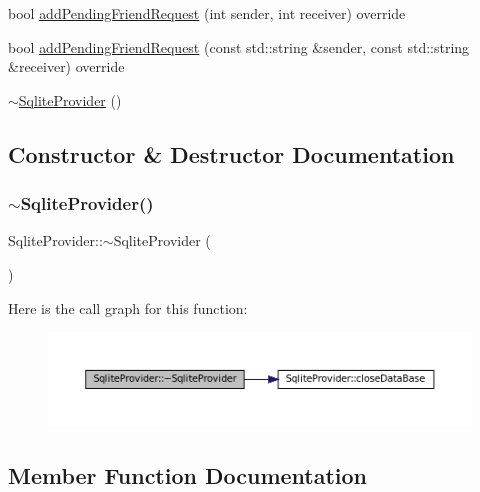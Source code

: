 \begin{DoxyCompactItemize}
\item 
bool \mbox{\hyperlink{classSqliteProvider_a085e35f6de7248f7142a8e6841ab3b65}{add\+Pending\+Friend\+Request}} (int sender, int receiver) override
\item 
bool \mbox{\hyperlink{classSqliteProvider_aac8f8614546a2c5e629ad84a3536adc8}{add\+Pending\+Friend\+Request}} (const std\+::string \&sender, const std\+::string \&receiver) override
\item 
\mbox{\hyperlink{classSqliteProvider_a3bfff74bcbaf4f2c0eb4363fc6a07f48}{$\sim$\+Sqlite\+Provider}} ()
\end{DoxyCompactItemize}


\subsection{Constructor \& Destructor Documentation}
\mbox{\label{classSqliteProvider_a3bfff74bcbaf4f2c0eb4363fc6a07f48}} 
\subsubsection{\texorpdfstring{$\sim$\+Sqlite\+Provider()}{~SqliteProvider()}}
{\footnotesize\ttfamily Sqlite\+Provider\+::$\sim$\+Sqlite\+Provider (\begin{DoxyParamCaption}{ }\end{DoxyParamCaption})\hspace{0.3cm}{\ttfamily [inline]}}

Here is the call graph for this function\+:
\nopagebreak
\begin{figure}[H]
\begin{center}
\leavevmode
\includegraphics[width=350pt]{classSqliteProvider_a3bfff74bcbaf4f2c0eb4363fc6a07f48_cgraph}
\end{center}
\end{figure}


\subsection{Member Function Documentation}
\mbox{\label{classSqliteProvider_a085e35f6de7248f7142a8e6841ab3b65}} 
